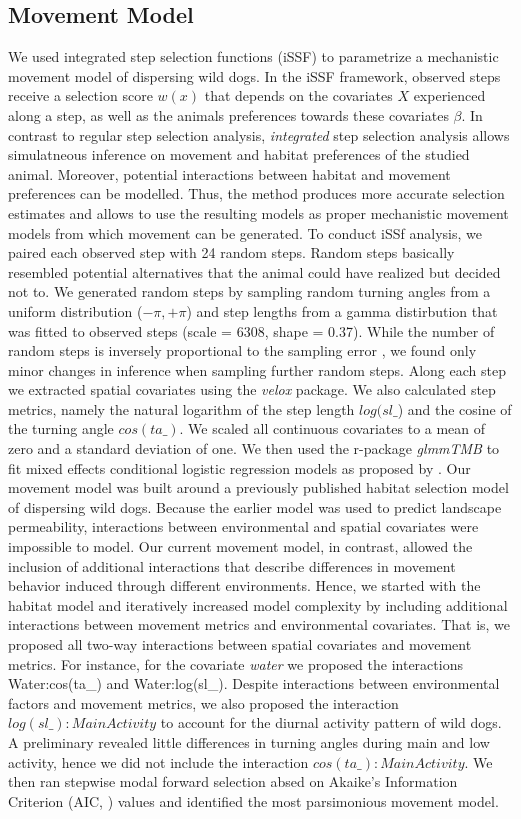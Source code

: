 \documentclass[abstract=on,10pt,a4paper,bibliography=totocnumbered]{article}
\begin{document}
\subsection{Movement Model}
We used integrated step selection functions (iSSF) to parametrize a mechanistic
movement model of dispersing wild dogs. In the iSSF framework, observed steps
receive a selection score \(w(x)\) that depends on the covariates \(X\)
experienced along a step, as well as the animals preferences towards these
covariates \(\beta\). In contrast to regular step selection analysis,
\textit{integrated} step selection analysis allows simulatneous inference on
movement and habitat preferences of the studied animal. Moreover, potential
interactions between habitat and movement preferences can be modelled. Thus, the
method produces more accurate selection estimates and allows to use the
resulting models as proper mechanistic movement models from which movement can
be generated. To conduct iSSf analysis, we paired each observed step with 24
random steps. Random steps basically resembled potential alternatives that the
animal could have realized but decided not to. We generated random steps by
sampling random turning angles from a uniform distribution (\(-\pi, +\pi\)) and
step lengths from a gamma distirbution that was fitted to observed steps (scale
= 6308, shape = 0.37). While the number of random steps is inversely
proportional to the sampling error \citep{Avgar.2016}, we found only minor
changes in inference when sampling further random steps. Along each step we
extracted spatial covariates using the \textit{velox} package. We also
calculated step metrics, namely the natural logarithm of the step length
\(log(sl\_\)) and the cosine of the turning angle \(cos(ta\_)\). We scaled all
continuous covariates to a mean of zero and a standard deviation of one. We then
used the r-package \textit{glmmTMB} to fit mixed effects conditional logistic
regression models as proposed by \citep{Muff.2020}. Our movement model was built
around a previously published habitat selection model of dispersing wild dogs.
Because the earlier model was used to predict landscape permeability,
interactions between environmental and spatial covariates were impossible to
model. Our current movement model, in contrast, allowed the inclusion of
additional interactions that describe differences in movement behavior induced
through different environments. Hence, we started with the habitat model and
iteratively increased model complexity by including additional interactions
between movement metrics and environmental covariates. That is, we proposed all
two-way interactions between spatial covariates and movement metrics. For
instance, for the covariate \textit{water} we proposed the interactions
Water:cos(ta\_) and Water:log(sl\_). Despite interactions between environmental
factors and movement metrics, we also proposed the interaction
\(log(sl\_):MainActivity\) to account for the diurnal activity pattern of wild
dogs. A preliminary revealed little differences in turning angles during main
and low activity, hence we did not include the interaction
\(cos(ta\_):MainActivity\). We then ran stepwise modal forward selection absed
on Akaike's Information Criterion (AIC, \citealp{Burnham.2002}) values and
identified the most parsimonious movement model.
\end{document}
